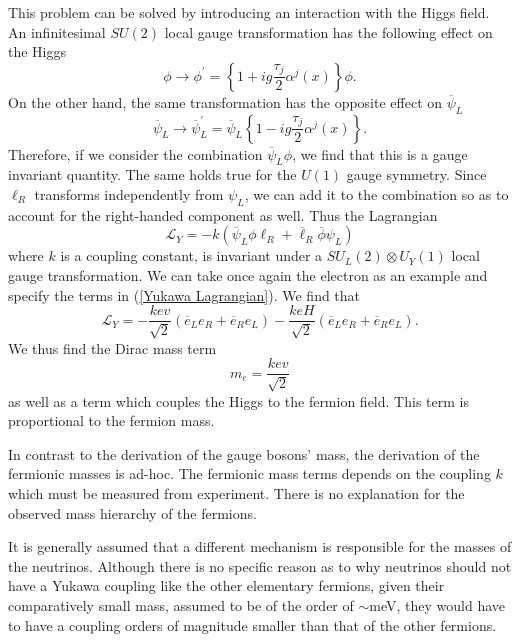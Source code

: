 \documentclass[10pt,a4paper]{book}
\begin{document}
This problem can be solved by introducing an interaction with the Higgs field. An infinitesimal $SU(2)$ local gauge transformation has the following effect on the Higgs
\begin{equation}
\phi \rightarrow \phi^\prime = \left\lbrace 1 + ig\frac{\tau_j}{2}\alpha^j(x)\right\rbrace\phi.
\end{equation} 
On the other hand, the same transformation has the opposite effect on $\overline{\psi}_L$
\begin{equation}
\overline{\psi}_L \rightarrow \overline{\psi}^\prime_L = \overline{\psi}_L\left\lbrace 1 - ig\frac{\tau_j}{2}\alpha^j(x) \right\rbrace.
\end{equation}
Therefore, if we consider the combination $\overline{\psi}_L\phi$, we find that this is a gauge invariant quantity. The same holds true for the $U(1)$ gauge symmetry.
Since $\ell_R$ transforms independently from $\psi_L$, we can add it to the combination so as to account for the right-handed component as well. Thus the Lagrangian
\begin{equation}
\label{Yukawa Lagrangian}
\mathcal{L}_Y = -k\left(\overline{\psi}_L\phi\ell_R + \overline{\ell}_R\overline{\phi}\psi_L\right)
\end{equation}
where $k$ is a coupling constant, is invariant under a $SU_L(2)\otimes U_Y(1)$ local gauge transformation.
We can take once again the electron as an example and specify the terms in (\ref{Yukawa Lagrangian}). We find that
\begin{equation}
\mathcal{L}_Y = -\frac{kev}{\sqrt{2}}\left(\overline{e}_L e_R +\overline{e}_R e_L\right) - \frac{keH}{\sqrt{2}}\left(\overline{e}_L e_R +\overline{e}_R e_L\right).
\end{equation}
We thus find the Dirac mass term
\begin{equation}
m_e = \frac{kev}{\sqrt{2}}
\end{equation}
as well as a term which couples the Higgs to the fermion field. This term is proportional to the fermion mass. 

In contrast to the derivation of the gauge bosons' mass, the derivation of the fermionic masses is ad-hoc. The fermionic mass terms depends on the coupling $k$ which must be measured from experiment. There is no explanation for the observed mass hierarchy of the fermions.

It is generally assumed that a different mechanism is responsible for the masses of the neutrinos. Although there is no specific reason as to why neutrinos should not have a Yukawa coupling like the other elementary fermions, given their comparatively small mass, assumed to be of the order of $\sim$meV, they would have to have a coupling orders of magnitude smaller than that of the other fermions. 
\end{document}
